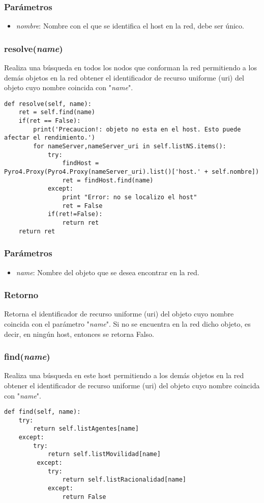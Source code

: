 \documentclass{article}
\begin{document}
\subsubsection*{Parámetros}
\begin{itemize}
\item \textit{nombre}: Nombre con el que se identifica el host en la red, debe ser único.
\end{itemize}
\subsubsection{\textbf{resolve}(\textit{name})}
Realiza una búsqueda en todos los nodos que conforman la red permitiendo a los demás objetos en la red obtener el identificador de recurso uniforme (uri) del objeto cuyo nombre coincida con "\textit{name}".
\begin{lstlisting}
def resolve(self, name):
	ret = self.find(name)
	if(ret == False):
		print('Precaucion!: objeto no esta en el host. Esto puede afectar el rendimiento.')
		for nameServer,nameServer_uri in self.listNS.items():
			try:                
				findHost = Pyro4.Proxy(Pyro4.Proxy(nameServer_uri).list()['host.' + self.nombre])
				ret = findHost.find(name)
			except:
				print "Error: no se localizo el host"
				ret = False
			if(ret!=False):
				return ret
	return ret
\end{lstlisting}
\subsubsection*{Parámetros}
\begin{itemize}
\item \textit{name}: Nombre del objeto que se desea encontrar en la red.
\end{itemize}
\subsubsection*{Retorno}
Retorna el identificador de recurso uniforme (uri) del objeto cuyo nombre coincida con el parámetro "\textit{name}". Si no se encuentra en la red dicho objeto, es decir, en ningún host, entonces se retorna Falso.
\subsubsection{\textbf{find}(\textit{name})}
Realiza una búsqueda en este host permitiendo a los demás objetos en la red obtener el identificador de recurso uniforme (uri) del objeto cuyo nombre coincida con "\textit{name}".
\begin{lstlisting}
def find(self, name):
	try:
		return self.listAgentes[name]
	except:
		try:
			return self.listMovilidad[name]
		 except:
			try:
				return self.listRacionalidad[name]
			except:
				return False
\end{lstlisting}
\end{document}

